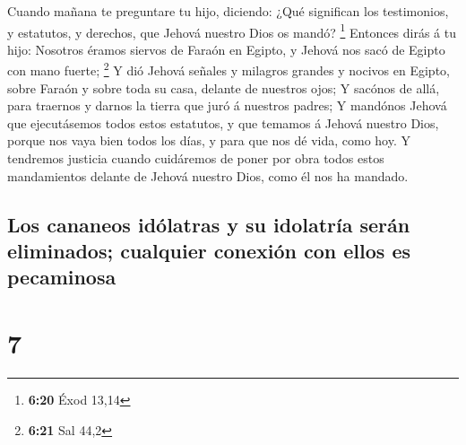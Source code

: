  Cuando mañana te preguntare tu hijo, diciendo: ¿Qué
significan los testimonios, y estatutos, y derechos, que Jehová nuestro
Dios os mandó? \footnote{\textbf{6:20} Éxod 13,14} 
Entonces dirás á tu hijo: Nosotros éramos siervos de Faraón en Egipto, y
Jehová nos sacó de Egipto con mano fuerte; \footnote{\textbf{6:21} Sal
  44,2}  Y dió Jehová señales y milagros grandes y
nocivos en Egipto, sobre Faraón y sobre toda su casa, delante de
nuestros ojos;  Y sacónos de allá, para traernos y darnos
la tierra que juró á nuestros padres;  Y mandónos Jehová
que ejecutásemos todos estos estatutos, y que temamos á Jehová nuestro
Dios, porque nos vaya bien todos los días, y para que nos dé vida, como
hoy.  Y tendremos justicia cuando cuidáremos de poner por
obra todos estos mandamientos delante de Jehová nuestro Dios, como él
nos ha mandado.

\hypertarget{los-cananeos-iduxf3latras-y-su-idolatruxeda-seruxe1n-eliminados-cualquier-conexiuxf3n-con-ellos-es-pecaminosa}{%
\subsection{Los cananeos idólatras y su idolatría serán eliminados;
cualquier conexión con ellos es
pecaminosa}\label{los-cananeos-iduxf3latras-y-su-idolatruxeda-seruxe1n-eliminados-cualquier-conexiuxf3n-con-ellos-es-pecaminosa}}

\hypertarget{section-6}{%
\section{7}\label{section-6}}


